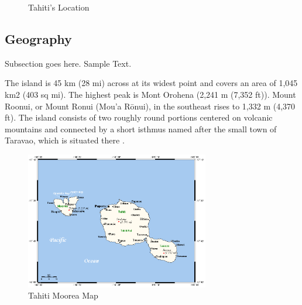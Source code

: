\documentclass[12pt,journal,onecolumn]{IEEEtran}
\begin{document}
\begin{figure}[!h]
	\centering
	\quad
	\quad
	\caption{Tahiti's Location}
	\label{tahitilocation}
\end{figure}

\subsection{Geography}

Subsection goes here. Sample Text.

The island is 45 km (28 mi) across at its widest point and covers an area of 1,045 km2 (403 sq mi). The highest peak is Mont Orohena (2,241 m (7,352 ft)). Mount Roonui, or Mount Ronui (Mou'a Rōnui), in the southeast rises to 1,332 m (4,370 ft). The island consists of two roughly round portions centered on volcanic mountains and connected by a short isthmus named after the small town of Taravao, which is situated there \cite{tahitiworldatlas}.

\begin{figure}[!h]
  \centering
  \includegraphics[height=6cm]{figures/TahitiMooreaMap.png}
  \caption{Tahiti Moorea Map}
  \label{tmmap}
\end{figure}
\end{document}
